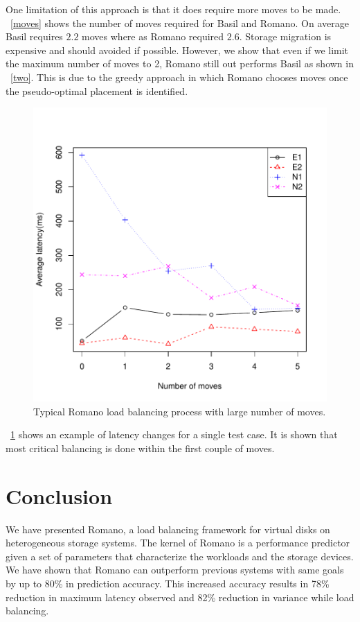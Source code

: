 One limitation of this approach is that it does require more moves to be made.
\figurename~\ref{moves} shows the number of moves required for Basil and Romano.
On average Basil requires $2.2$ moves where as Romano required $2.6$.
Storage migration is expensive and should avoided if possible.
However, we show that even if we limit the maximum number of moves to 2, Romano still out performs Basil as shown in \figurename~\ref{two}.
This is due to the greedy approach in which Romano chooses moves once the pseudo-optimal placement is identified.
\begin{figure}[!t]
\centering
\includegraphics[width=\textwidth]{figure/23latency_reduction.pdf}
\caption{Typical Romano load balancing process with large number of moves.}
\label{proc}
\end{figure}
\figurename~\ref{proc} shows an example of latency changes for a single test case.
It is shown that most critical balancing is done within the first couple of moves.
~
\section{Conclusion}\label{CONCL}
We have presented Romano, a load balancing framework for virtual disks
on heterogeneous storage systems. The kernel of Romano is a performance
predictor given a set of parameters that characterize the workloads and
the storage devices. We have shown that Romano can outperform
previous systems with same goals by up to 80\% in prediction
accuracy. This increased accuracy results in 78\% reduction in maximum
latency observed and 82\% reduction in variance while load balancing.


